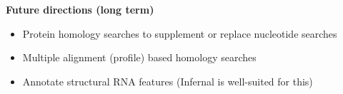 \documentclass[landscape]{slides}
\begin{document}
\begin{slide}
\begin{center}
\textbf{Future directions (long term)}

\small

\begin{itemize}
\item  Protein homology searches to supplement or replace nucleotide searches
\item  Multiple alignment (profile) based homology searches 
\item  Annotate structural RNA features (Infernal is well-suited for this)
\end{itemize}


\vfill
\end{center}
\end{slide}
\end{document}
